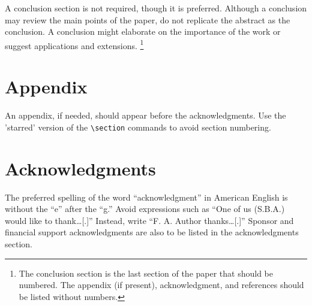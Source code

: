 \documentclass{aiaa-tc}%
\begin{document}
A conclusion section is not required, though it is preferred.
Although a conclusion may review the main points of the paper, do not
replicate the abstract as the conclusion.
A conclusion might elaborate on the importance of the work or suggest
applications and extensions.%
\footnote{The conclusion section is the last section of
  the paper that should be numbered.
  The appendix (if present), acknowledgment, and references should be
  listed without numbers.}

\section*{Appendix}

An appendix, if needed, should appear before the acknowledgments.
Use the 'starred' version of the \verb|\section| commands to avoid
section numbering.

\section*{Acknowledgments}

The preferred spelling of the word ``acknowledgment'' in American
English is without the ``e'' after the ``g.''
Avoid expressions such as ``One of us (S.B.A.) would like to thank\ldots[.]''
Instead, write ``F. A. Author thanks\ldots[.]''
Sponsor and financial support acknowledgments are also to be listed in
the acknowledgments section.



\end{document}
